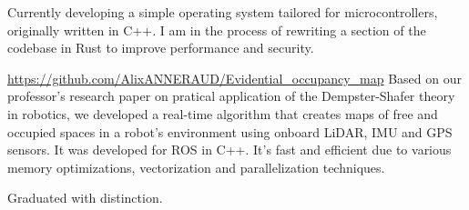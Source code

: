 \documentclass[10pt,a4paper,ragged2e,withhyper]{./AltaCV/altacv}
\begin{document}
\begin{paracol}{2}
  \smallskip


  Currently developing a simple operating system tailored for microcontrollers, originally written in C++.
  I am in the process of rewriting a section of the codebase in Rust to improve performance and security.

  \divider

  {\url{https://github.com/AlixANNERAUD/Evidential_occupancy_map}}
  {}
  {}
  Based on our professor’s research paper on pratical application of the Dempster-Shafer theory in robotics, we developed a real-time algorithm that creates maps of free and occupied spaces in a robot’s environment using onboard LiDAR, IMU and GPS sensors.
  It was developed for ROS in C++.
  It's fast and efficient due to various memory optimizations, vectorization and parallelization techniques. 

  \medskip

  \switchcolumn



  \divider

  Graduated with distinction.

  \divider


  \smallskip



  \divider


  \divider



  \\


\end{paracol}
\end{document}
